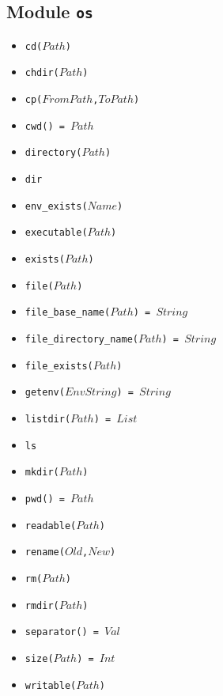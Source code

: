 \documentclass[10pt]{article}
\newcommand{\ignore}[1]{}
\begin{document}
\begin{multicols}{2}
\section*{Module \texttt{os}}
\begin{scriptsize}
\begin{itemize}
\item \texttt{cd($Path$)}
\item \texttt{chdir($Path$)}
\item \texttt{cp($FromPath$,$ToPath$)}
\item \texttt{cwd() = $Path$}
\item \texttt{directory($Path$)}
\item \texttt{dir}
\item \texttt{env\_exists($Name$)}
\item \texttt{executable($Path$)}
\item \texttt{exists($Path$)}
\item \texttt{file($Path$)}
\item \texttt{file\_base\_name($Path$) = $String$}
\item \texttt{file\_directory\_name($Path$) = $String$}
\item \texttt{file\_exists($Path$)}
\item \texttt{getenv($EnvString$) = $String$}
\item \texttt{listdir($Path$) = $List$}
\item \texttt{ls}
\item \texttt{mkdir($Path$)}
\item \texttt{pwd() = $Path$}
\item \texttt{readable($Path$)}
\item \texttt{rename($Old$,$New$)}
\item \texttt{rm($Path$)}
\item \texttt{rmdir($Path$)}
\item \texttt{separator() = $Val$}
\item \texttt{size($Path$) = $Int$}
\item \texttt{writable($Path$)}
\ignore{
\item \texttt{atime($Path$) = $DateTime$}
\item \texttt{block\_special($Path$)}
\item \texttt{char\_special($Path$)}
\item \texttt{chmod($Path$,$Mode$)}
\item \texttt{create($Path$)}
\item \texttt{create($Path$,$Mode$)}
}
\end{itemize}
\end{scriptsize}
\end{multicols}
\end{document}
